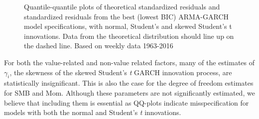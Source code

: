 \begin{figure}[!pt]
  \caption{Quantile-quantile plots of theoretical standardized residuals and standardized residuals from the best (lowest BIC) ARMA-GARCH model specifications, with normal, Student's and skewed Student's t innovations. Data from the theoretical distribution should line up on the dashed line. Based on weekly data 1963-2016}
  \label{fig:garch_qq}
\end{figure}



For both the value-related and non-value related factors, many of the estimates of $\gamma_i$, the skewness of the skewed Student's \textit{t} GARCH innovation process, are statistically insignificant. This is also the case for the degree of freedom estimates for SMB and Mom. Although these parameters are not significantly estimated, we believe that including them is essential as QQ-plots indicate misspecification for models with both the normal and Student's \textit{t} innovations.

